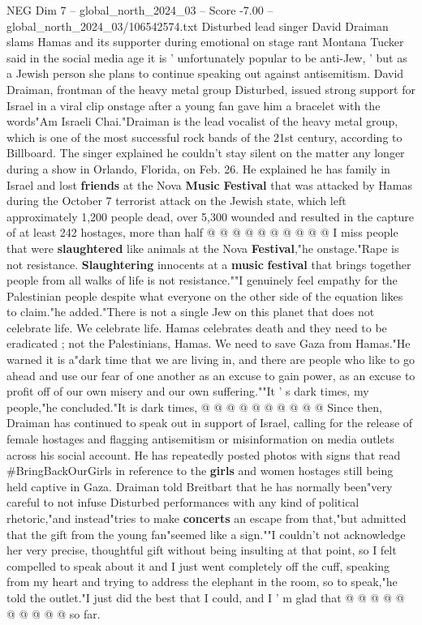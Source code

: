 \begin{textsample}{NEG Dim 7 – global\_north\_2024\_03 – Score -7.00 – global\_north\_2024\_03/106542574.txt}  \label{ex:f7_neg_238}
Disturbed lead singer David Draiman slams Hamas and its supporter during emotional on stage rant Montana Tucker said in the social media age it is ' unfortunately popular to be anti-Jew, ' but as a Jewish person she plans to continue speaking out against antisemitism.
David Draiman, frontman of the heavy metal group Disturbed, issued strong support for Israel in a viral clip onstage after a young fan gave him a bracelet with the words"Am Israeli Chai."Draiman is the lead vocalist of the heavy metal group, which is one of the most successful rock bands of the 21st century, according to Billboard.
The singer explained he couldn't stay silent on the matter any longer during a show in Orlando, Florida, on Feb. 26.
He explained he has family in Israel and lost \textbf{friends} at the Nova \textbf{Music} \textbf{Festival} that was attacked by Hamas during the October 7 terrorist attack on the Jewish state, which left approximately 1,200 people dead, over 5,300 wounded and resulted in the capture of at least 242 hostages, more than half @ @ @ @ @ @ @ @ @ @ I miss people that were \textbf{slaughtered} like animals at the Nova \textbf{Festival},"he onstage."Rape is not resistance. \textbf{Slaughtering} innocents at a \textbf{music} \textbf{festival} that brings together people from all walks of life is not resistance.""I genuinely feel empathy for the Palestinian people despite what everyone on the other side of the equation likes to claim."he added."There is not a single Jew on this planet that does not celebrate life.
We celebrate life.
Hamas celebrates death and they need to be eradicated ; not the Palestinians, Hamas.
We need to save Gaza from Hamas."He warned it is a"dark time that we are living in, and there are people who like to go ahead and use our fear of one another as an excuse to gain power, as an excuse to profit off of our own misery and our own suffering.""It ' s dark times, my people,"he concluded."It is dark times, @ @ @ @ @ @ @ @ @ @ Since then, Draiman has continued to speak out in support of Israel, calling for the release of female hostages and flagging antisemitism or misinformation on media outlets across his social account.
He has repeatedly posted photos with signs that read \#BringBackOurGirls in reference to the \textbf{girls} and women hostages still being held captive in Gaza.
Draiman told Breitbart that he has normally been"very careful to not infuse Disturbed performances with any kind of political rhetoric,"and instead"tries to make \textbf{concerts} an escape from that,"but admitted that the gift from the young fan"seemed like a sign.""I couldn't not acknowledge her very precise, thoughtful gift without being insulting at that point, so I felt compelled to speak about it and I just went completely off the cuff, speaking from my heart and trying to address the elephant in the room, so to speak,"he told the outlet."I just did the best that I could, and I ' m glad that @ @ @ @ @ @ @ @ @ @ so far.

\end{textsample}
